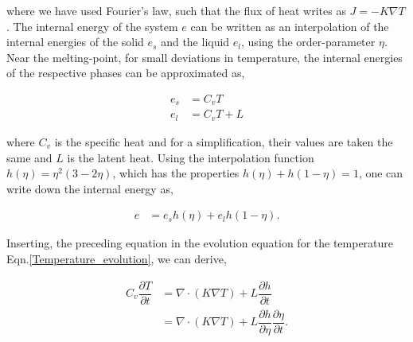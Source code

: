 \documentclass[english]{iambook}
\begin{document}
where we have used Fourier's law, such that the flux of heat writes as $J=-K\nabla T$.
The internal energy of the system $e$ can be written as an interpolation of
the internal energies of the solid $e_s$ and the liquid $e_l$, using the
order-parameter $\eta$. Near the melting-point, for small deviations in 
temperature, the internal energies of the respective phases can 
be approximated as, 

\begin{align}
 e_s &= C_v T\\
 e_l &= C_v T + L 
\end{align}

where $C_v$ is the specific heat and for a simplification, 
their values are taken the same and $L$ is the latent heat.
Using the interpolation function $h\left(\eta\right)=\eta^{2}\left(3-2\eta\right)$,
which has the properties $h\left(\eta\right) + h\left(1-\eta\right)=1$,
one can write down the internal energy as, 

\begin{align}
 e &= e_s h\left(\eta\right) + e_l h\left(1-\eta\right).
\end{align}

Inserting, the preceding equation in the evolution equation 
for the temperature Eqn.\ref{Temperature_evolution}, we can 
derive, 

\begin{align}
 C_v\dfrac{\partial T}{\partial t} &= \nabla\cdot\left(K\nabla T\right) + L \dfrac{\partial h}{\partial t} \\
                                   &= \nabla\cdot\left(K\nabla T\right) + L \dfrac{\partial h}{\partial \eta}\dfrac{\partial \eta}{\partial t}.
\label{energy-conservation-pure}
\end{align}
\end{document}

